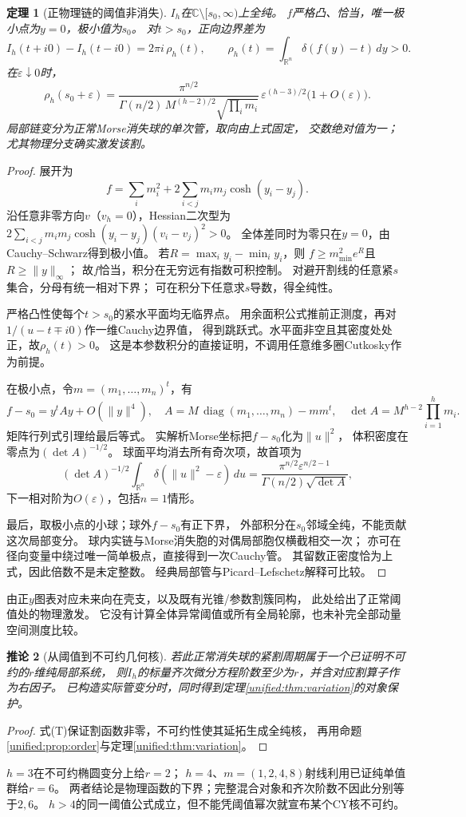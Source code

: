 \documentclass[11pt,a4paper,oneside]{ctexart}
\theoremstyle{cnplain}
\newtheorem{theorem}{定理}[section]
\newtheorem{corollary}[theorem]{推论}
\theoremstyle{definition}
\theoremstyle{remark}
\numberwithin{equation}{section}
\begin{document}
\begin{theorem}[正物理链的阈值非消失]\label{unified:thm:threshold}
$I_h$在$\mathbb C\setminus[s_0,\infty)$上全纯。
$f$严格凸、恰当，唯一极小点为$y=0$，极小值为$s_0$。
对$t>s_0$，正向边界差为
\[
 I_h(t+i0)-I_h(t-i0)=2\pi i\,\rho_h(t),\qquad
 \rho_h(t)=\int_{\mathbb R^n}\delta(f(y)-t)\,dy>0.
\]
在$\varepsilon\downarrow0$时，
\[
 \rho_h(s_0+\varepsilon)=
 \frac{\pi^{n/2}}
 {\Gamma(n/2)\,M^{(h-2)/2}\sqrt{\prod_i m_i}}\,
 \varepsilon^{(h-3)/2}\bigl(1+O(\varepsilon)\bigr).
 \tag{T}
\]
局部链变分为正常Morse消失球的单次管，取向由上式固定，
交数绝对值为一；尤其物理分支确实激发该割。
\end{theorem}
\begin{proof}
展开为
\[
 f=\sum_i m_i^2+2\sum_{i<j}m_i m_j\cosh(y_i-y_j).
\]
沿任意非零方向$v$（$v_h=0$），Hessian二次型为
$2\sum_{i<j}m_i m_j\cosh(y_i-y_j)(v_i-v_j)^2>0$。
全体差同时为零只在$y=0$，由Cauchy--Schwarz得到极小值。
若$R=\max_i y_i-\min_i y_i$，则
$f\ge m_{\min}^2e^R$且$R\ge\|y\|_\infty$；
故$f$恰当，积分在无穷远有指数可积控制。
对避开割线的任意紧$s$集合，分母有统一相对下界；
可在积分下任意求$s$导数，得全纯性。

严格凸性使每个$t>s_0$的紧水平面均无临界点。
用余面积公式推前正测度，再对$1/(u-t\mp i0)$作一维Cauchy边界值，
得到跳跃式。水平面非空且其密度处处正，故$\rho_h(t)>0$。
这是本参数积分的直接证明，不调用任意维多圈Cutkosky作为前提。

在极小点，令$m=(m_1,\ldots,m_n)^t$，有
\[
 f-s_0=y^tAy+O(\|y\|^4),\quad
 A=M\,\operatorname{diag}(m_1,\ldots,m_n)-mm^t,
 \quad \det A=M^{h-2}\prod_{i=1}^h m_i.
\]
矩阵行列式引理给最后等式。
实解析Morse坐标把$f-s_0$化为$\|u\|^2$，
体积密度在零点为$(\det A)^{-1/2}$。
球面平均消去所有奇次项，故首项为
\[
 (\det A)^{-1/2}
 \int_{\mathbb R^n}\delta(\|u\|^2-\varepsilon)\,du
 =\frac{\pi^{n/2}\varepsilon^{n/2-1}}
 {\Gamma(n/2)\sqrt{\det A}},
\]
下一相对阶为$O(\varepsilon)$，包括$n=1$情形。

最后，取极小点的小球；球外$f-s_0$有正下界，
外部积分在$s_0$邻域全纯，不能贡献这次局部变分。
球内实链与Morse消失胞的对偶局部胞仅横截相交一次；
亦可在径向变量中绕过唯一简单极点，直接得到一次Cauchy管。
其留数正密度恰为上式，因此倍数不是未定整数。
经典局部管与Picard--Lefschetz解释可比较\cite[\S2.3]{muhlbauer}。
\end{proof}
由正$y$图表对应未来向在壳支，以及既有光锥/参数割簇同构，
此处给出了正常阈值处的物理激发。
它没有计算全体异常阈值或所有全局轮廓，也未补完全部动量空间测度比较。

\begin{corollary}[从阈值到不可约几何核]\label{unified:cor:banana-threshold}
若此正常消失球的紧割周期属于一个已证明不可约的$r$维纯局部系统，
则$I_h$的标量齐次微分方程阶数至少为$r$，并含对应割算子作为右因子。
已构造实际管变分时，同时得到定理\ref{unified:thm:variation}的对象保护。
\end{corollary}
\begin{proof}
式(T)保证割函数非零，不可约性使其延拓生成全纯核，
再用命题\ref{unified:prop:order}与定理\ref{unified:thm:variation}。
\end{proof}
$h=3$在不可约椭圆变分上给$r=2$；
$h=4$、$m=(1,2,4,8)$射线利用已证纯单值群给$r=6$。
两者结论是物理函数的下界；完整混合对象和齐次阶数不因此分别等于$2,6$。
$h>4$的同一阈值公式成立，但不能凭阈值幂次就宣布某个CY核不可约。
\end{document}
